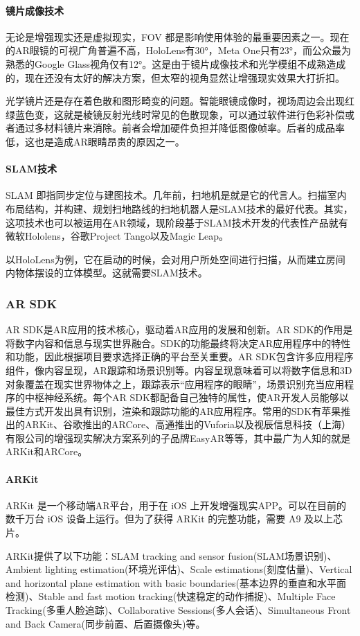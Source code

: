 \documentclass{article}
\begin{document}
\paragraph{镜片成像技术}
无论是增强现实还是虚拟现实，FOV 都是影响使用体验的最重要因素之一。现在的AR眼镜的可视广角普遍不高，HoloLens有30°，Meta One只有23°，而公众最为熟悉的Google Glass视角仅有12°。这是由于镜片成像技术和光学模组不成熟造成的，现在还没有太好的解决方案，但太窄的视角显然让增强现实效果大打折扣。\par
光学镜片还是存在着色散和图形畸变的问题。智能眼镜成像时，视场周边会出现红绿蓝色变，这就是棱镜反射光线时常见的色散现象，可以通过软件进行色彩补偿或者通过多材料镜片来消除。前者会增加硬件负担并降低图像帧率。后者的成品率低，这也是造成AR眼睛昂贵的原因之一。\par
\paragraph{SLAM技术}
SLAM 即指同步定位与建图技术。几年前，扫地机是就是它的代言人。扫描室内布局结构，并构建、规划扫地路线的扫地机器人是SLAM技术的最好代表。其实，这项技术也可以被运用在AR领域，现阶段基于SLAM技术开发的代表性产品就有微软Hololens，谷歌Project Tango以及Magic Leap。\par
以HoloLens为例，它在启动的时候，会对用户所处空间进行扫描，从而建立房间内物体摆设的立体模型。这就需要SLAM技术。\par
\subsubsection{AR SDK}
AR SDK是AR应用的技术核心，驱动着AR应用的发展和创新。AR SDK的作用是将数字内容和信息与现实世界融合。SDK的功能最终将决定AR应用程序中的特性和功能，因此根据项目要求选择正确的平台至关重要。AR SDK包含许多应用程序组件，像内容呈现，AR跟踪和场景识别等。内容呈现意味着可以将数字信息和3D对象覆盖在现实世界物体之上，跟踪表示“应用程序的眼睛”，场景识别充当应用程序的中枢神经系统。每个AR SDK都配备自己独特的属性，使AR开发人员能够以最佳方式开发出具有识别，渲染和跟踪功能的AR应用程序。常用的SDK有苹果推出的ARKit、谷歌推出的ARCore、高通推出的Vuforia以及视辰信息科技（上海）有限公司的增强现实解决方案系列的子品牌EasyAR等等，其中最广为人知的就是ARKit和ARCore。\par
\paragraph{ARKit}
ARKit 是一个移动端AR平台，用于在 iOS 上开发增强现实APP。可以在目前的数千万台 iOS 设备上运行。但为了获得 ARKit 的完整功能，需要 A9 及以上芯片。\par
ARKit提供了以下功能：SLAM tracking and sensor fusion(SLAM场景识别)、Ambient lighting estimation(环境光评估)、Scale estimations(刻度估量)、Vertical and horizontal plane estimation with basic boundaries(基本边界的垂直和水平面检测)、Stable and fast motion tracking(快速稳定的动作捕捉)、Multiple Face Tracking(多重人脸追踪)、Collaborative Sessions(多人会话)、Simultaneous Front and Back Camera(同步前置、后置摄像头)等。\par
\end{document}
